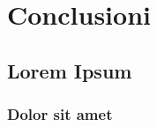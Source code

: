 \chapter*{Conclusioni}
\label{chap:concl}

\lipsum[1]

\section{Lorem Ipsum}
\lipsum[2-4]

\subsection{Dolor sit amet}
\lipsum[5-7]
